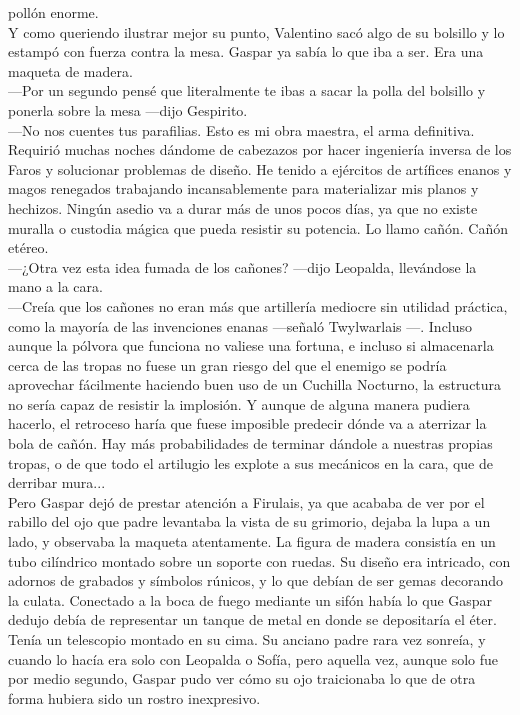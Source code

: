 \documentclass[
  letterpaper,
]{krantz}
\begin{document}
pollón enorme.\\
Y como queriendo ilustrar mejor su punto, Valentino sacó algo de su
bolsillo y lo estampó con fuerza contra la mesa. Gaspar ya sabía lo que
iba a ser. Era una maqueta de madera.\\
---Por un segundo pensé que literalmente te ibas a sacar la polla del
bolsillo y ponerla sobre la mesa ---dijo Gespirito.\\
---No nos cuentes tus parafilias. Esto es mi obra maestra, el arma
definitiva. Requirió muchas noches dándome de cabezazos por hacer
ingeniería inversa de los Faros y solucionar problemas de diseño. He
tenido a ejércitos de artífices enanos y magos renegados trabajando
incansablemente para materializar mis planos y hechizos. Ningún asedio
va a durar más de unos pocos días, ya que no existe muralla o custodia
mágica que pueda resistir su potencia. Lo llamo cañón. Cañón etéreo.\\
---¿Otra vez esta idea fumada de los cañones? ---dijo Leopalda,
llevándose la mano a la cara.\\
---Creía que los cañones no eran más que artillería mediocre sin
utilidad práctica, como la mayoría de las invenciones enanas ---señaló
Twylwarlais ---. Incluso aunque la pólvora que funciona no valiese una
fortuna, e incluso si almacenarla cerca de las tropas no fuese un gran
riesgo del que el enemigo se podría aprovechar fácilmente haciendo buen
uso de un Cuchilla Nocturno, la estructura no sería capaz de resistir la
implosión. Y aunque de alguna manera pudiera hacerlo, el retroceso haría
que fuese imposible predecir dónde va a aterrizar la bola de cañón. Hay
más probabilidades de terminar dándole a nuestras propias tropas, o de
que todo el artilugio les explote a sus mecánicos en la cara, que de
derribar mura...\\
Pero Gaspar dejó de prestar atención a Firulais, ya que acababa de ver
por el rabillo del ojo que padre levantaba la vista de su grimorio,
dejaba la lupa a un lado, y observaba la maqueta atentamente. La figura
de madera consistía en un tubo cilíndrico montado sobre un soporte con
ruedas. Su diseño era intricado, con adornos de grabados y símbolos
rúnicos, y lo que debían de ser gemas decorando la culata. Conectado a
la boca de fuego mediante un sifón había lo que Gaspar dedujo debía de
representar un tanque de metal en donde se depositaría el éter. Tenía un
telescopio montado en su cima. Su anciano padre rara vez sonreía, y
cuando lo hacía era solo con Leopalda o Sofía, pero aquella vez, aunque
solo fue por medio segundo, Gaspar pudo ver cómo su ojo traicionaba lo
que de otra forma hubiera sido un rostro inexpresivo.
\end{document}

